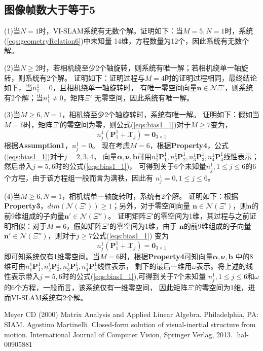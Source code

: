 \documentclass{article}
\begin{document}
\subsection{图像帧数大于等于5}
(1)当$N=1$时，VI-SLAM系统有无数个解。证明如下：当$M=5,N=1$时，系统(\ref{eqs:geometryRelation6})中未知量
14维，方程数量为12个，因此系统有无数个解。
\par
(2)当$N\geqslant 2$时，若相机绕至少2个轴旋转，则系统有唯一解；若相机绕单一轴旋转，则系统有2个解。
证明如下：证明过程与$M=4$时的证明过程相同，最终结论如下，当$n_1^1=0$，且相机绕单一轴旋转时，
有唯一零空间向量$\textbf{n}\in \mathcal{N}{\Xi'}$，则系统有2个解；当$n_1^1\not=0$，矩阵$\Xi'$
无零空间，因此系统有唯一解。
\par
(3)当$M\geqslant 6, N=1$，相机绕至少2个轴旋转时，系统有唯一解。
证明如下：假如当$M=6$时，矩阵$\Xi'$的零空间为零，则公式(\ref{eqs:bias1_1})对于$M\geqslant 7$变为，
\begin{equation}
    n_j^1(\textbf{P}_1^1+\mathcal{X}_j)=\textbf{0}_{3\times 1}
\end{equation}
根据\textbf{Assumption1}，$n_j^1=0$。
现在考虑$M=6$，根据\textbf{Property4}，公式(\ref{eqs:bias1_1})对于$j=2,3,4$，
向量$\mathbf{\alpha},\mathbf{\nu},\textbf{b}$可用$n_1^1\textbf{P}_1^1,n_2^1\textbf{P}_2^1,
n_3^1\textbf{P}_3^1,n_4^1\textbf{P}_4^1$线性表示；然后带入$j=5,6$时的公式(\ref{eqs:bias1_1})，
可得到关于6个未知量$n_j^1,1\leqslant j \leqslant 6$的6个方程，由于该方程组一般而言为满秩，因此有
$n_j^1=0,1\leqslant j \leqslant 6$。
\par
(4)当$M\geqslant 6, N=1$，相机绕单一轴旋转时，系统有2个解。
证明如下：根据\textbf{Property3}，$dim(\mathcal{N}(\Xi'))\geqslant 1$；另外，对于零空间向量
$\textbf{n}\in \mathcal{N}(\Xi')$，则$\textbf{n}$的前9维组成的子向量$\textbf{n}'\in \mathcal{N}(\Xi'')$。
证明矩阵$\Xi'$的零空间为1维，其过程与之前证明相似：对于$M=6$，假如矩阵$\Xi'$的零空间为1维，由于
$\textbf{n}$的前9维组成的子向量$\textbf{n}'\in \mathcal{N}(\Xi'')$，则对于$j\geqslant 7$公式(\ref{eqs:bias1_1})
变为
\begin{equation}
    n_j^1(\textbf{P}_1^1+\mathcal{X}_j)=\textbf{0}_{3\times 1}
\end{equation}
即可知系统仅有1维零空间。当$M=6$时，根据\textbf{Property4}可知向量$\mathbf{\alpha},\mathbf{\nu},\textbf{b}$
中的8维可由$n_1^1\textbf{P}_1^1,n_2^1\textbf{P}_2^1,n_3^1\textbf{P}_3^1,n_4^1\textbf{P}_4^1$线性表示，
剩下的最后一维用$\omega$表示。将上述的线性表示带入$j=5,6$时的公式(\ref{eqs:bias1_1}),可得到关于7个未知量
$n_j^1,1\leqslant j\leqslant 6$和$\omega$的6个方程，一般而言，该系统仅有一维零空间，
因此矩阵$\Xi'$的零空间为1维，进而VI-SLAM系统有2个解。


\begin{thebibliography}{99}  
    Meyer CD (2000) Matrix Analysis and Applied Linear Algebra. Philadelphia, PA: SIAM.
     Agostino Martinelli. Closed-form solution of visual-inertial structure from motion. International
    Journal of Computer Vision, Springer Verlag, 2013. ￿hal-00905881
\end{thebibliography}
\end{document}
